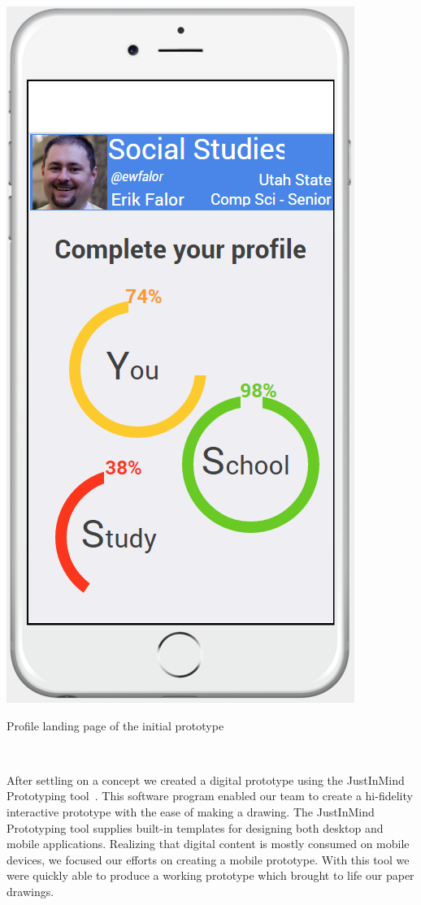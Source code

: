 \documentclass{sigchi-ext}
\begin{document}
\begin{marginfigure}[-7pc]
	\begin{minipage}{\marginparwidth}
		\centering
		\includegraphics[width=0.9\columnwidth]{figures/prototype1.png}
		\caption{Profile landing page of the initial prototype}~\label{fig:prototype}
	\end{minipage}
\end{marginfigure}


After settling on a concept we created a digital prototype using the JustInMind Prototyping
tool~\cite{justinmind}. This software program enabled our team to create a hi-fidelity interactive
prototype with the ease of making a drawing. The JustInMind Prototyping tool supplies built-in
templates for designing both desktop and mobile applications. Realizing that digital content is
mostly consumed on mobile devices, we focused our efforts on creating a mobile prototype. With this
tool we were quickly able to produce a working prototype which brought to life our paper drawings.
\end{document}
